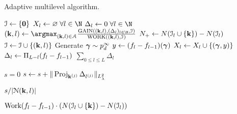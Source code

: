 \begin{algorithm}[ht]
\caption{Adaptive multilevel algorithm.}\label{alg:adaptive}
\begin{algorithmic}[1]
		\State  $\mathcal{I}\gets \{\mathbf{0}\}$
		\State $X_l\gets \varnothing\;\forall l\in\N$
		\State $\Delta_l\gets 0\;\forall l\in\N$
			\State $(\mi,l)\gets \argmax_{(\mi,l)\in\mia}\frac{\text{GAIN}((\mi,l),(\Delta_l)_{l\in\N},\mis)}{\text{WORK}((\mi,l),\mis)}$
			\State $N_{+}\gets N(\mathcal{I}_{l}\cup\{\mathbf{k}\})-N(\mathcal{I}_{l})$
			\State $\mathcal{I}\gets \mathcal{I}\cup\{(\mathbf{k},l)\}$
				\State Generate $\bm{\gamma}\sim p^{\infty}_{d}$
				\State $y\gets (f_{l}-f_{l-1})(\bm{\gamma})$
				\State $X_l\gets X_l\cup\{(\bm{\gamma},y)\}$
			\EndFor
			\State $\Delta_l\gets \Pi_{L-l}(f_{l}-f_{l-1})$
		\EndFor
		\State \Return $\sum_{0\leq l\leq L}\Delta_l$
	\EndFunction
	\item[]
		\State $s=0$
			\State $s\gets s+\|\operatorname{Proj}_{\mathbf{k}^{(j)}}\Delta_{l^{(j)}} \|_{L^2_{\lambda}}$
		\EndFor

		\State \Return $s/|\mathcal{N}(\mathbf{k},l)|$
	\EndFunction
	\item[]
		\State \Return $\text{Work}(f_{l}-f_{l-1})\cdot\left(N(\mathcal{I}_{l}\cup\{\mathbf{k}\})-N(\mathcal{I}_{l})\right)$
	\EndFunction

\end{algorithmic}
\end{algorithm}
